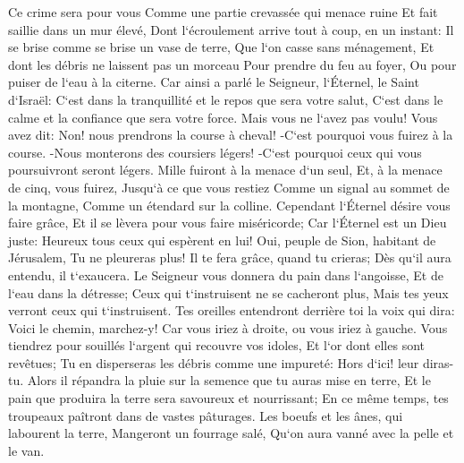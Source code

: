 \verse Ce crime sera pour vous Comme une partie crevassée qui menace ruine Et fait saillie dans un mur élevé, Dont l`écroulement arrive tout à coup, en un instant: 
\verse Il se brise comme se brise un vase de terre, Que l`on casse sans ménagement, Et dont les débris ne laissent pas un morceau Pour prendre du feu au foyer, Ou pour puiser de l`eau à la citerne. 
\verse Car ainsi a parlé le Seigneur, l`Éternel, le Saint d`Israël: C`est dans la tranquillité et le repos que sera votre salut, C`est dans le calme et la confiance que sera votre force. Mais vous ne l`avez pas voulu! 
\verse Vous avez dit: Non! nous prendrons la course à cheval! -C`est pourquoi vous fuirez à la course. -Nous monterons des coursiers légers! -C`est pourquoi ceux qui vous poursuivront seront légers. 
\verse Mille fuiront à la menace d`un seul, Et, à la menace de cinq, vous fuirez, Jusqu`à ce que vous restiez Comme un signal au sommet de la montagne, Comme un étendard sur la colline. 
\verse Cependant l`Éternel désire vous faire grâce, Et il se lèvera pour vous faire miséricorde; Car l`Éternel est un Dieu juste: Heureux tous ceux qui espèrent en lui! 
\verse Oui, peuple de Sion, habitant de Jérusalem, Tu ne pleureras plus! Il te fera grâce, quand tu crieras; Dès qu`il aura entendu, il t`exaucera. 
\verse Le Seigneur vous donnera du pain dans l`angoisse, Et de l`eau dans la détresse; Ceux qui t`instruisent ne se cacheront plus, Mais tes yeux verront ceux qui t`instruisent. 
\verse Tes oreilles entendront derrière toi la voix qui dira: Voici le chemin, marchez-y! Car vous iriez à droite, ou vous iriez à gauche. 
\verse Vous tiendrez pour souillés l`argent qui recouvre vos idoles, Et l`or dont elles sont revêtues; Tu en disperseras les débris comme une impureté: Hors d`ici! leur diras-tu. 
\verse Alors il répandra la pluie sur la semence que tu auras mise en terre, Et le pain que produira la terre sera savoureux et nourrissant; En ce même temps, tes troupeaux paîtront dans de vastes pâturages. 
\verse Les boeufs et les ânes, qui labourent la terre, Mangeront un fourrage salé, Qu`on aura vanné avec la pelle et le van. 
